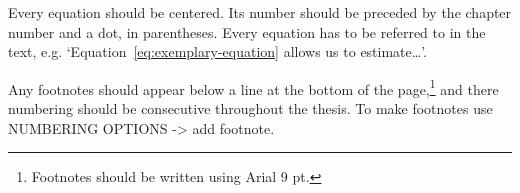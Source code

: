 Every equation should be centered. Its number should be preceded by the chapter number and a dot, in parentheses. Every equation has to be referred to in the text, e.g. `Equation~\eqref{eq:exemplary-equation} allows us to estimate\ldots'.

Any footnotes should appear below a line at the bottom of the page,\footnote{Footnotes should be written using Arial 9 pt.} and there numbering should be consecutive throughout the thesis. To make footnotes use NUMBERING OPTIONS -\textgreater{} add footnote.